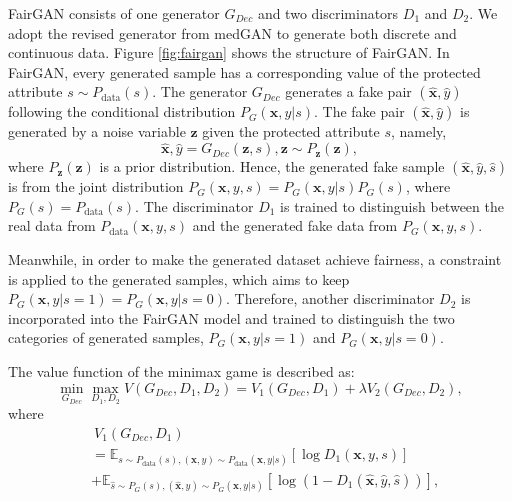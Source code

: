 \documentclass[sigconf]{acmart}
\theoremstyle{definition}
\begin{document}
FairGAN consists of one generator $G_{Dec}$ and two discriminators $D_1$ and $D_2$. We adopt the revised generator from medGAN \cite{Choi2017Generating} to generate both discrete and continuous data. Figure \ref{fig:fairgan} shows the structure of FairGAN. 
In FairGAN, every generated sample has a corresponding value of the protected attribute $s \sim P_{\text{data}}(s)$. The generator $G_{Dec}$ generates a fake pair $(\hat{\mathbf{x}},\hat{y})$ following the conditional distribution $P_{G}(\mathbf{x},y|s)$. The fake pair $(\hat{\mathbf{x}},\hat{y})$ is generated by a noise variable $\mathbf{z}$ given the protected attribute $s$, namely, 
\begin{equation}
\label{eq:generator}
\hat{\mathbf{x}},\hat{y} = G_{Dec}(\mathbf{z},s), \mathbf{z} \sim P_{\mathbf{z}}(\mathbf{z}), 
\end{equation}
where $P_{\mathbf{z}}(\mathbf{z})$ is a prior distribution. Hence, the generated fake sample $(\hat{\mathbf{x}},\hat{y},\hat{s})$ is from the joint distribution $P_{G}(\mathbf{x},y,s)=P_{G}(\mathbf{x},y|s)P_{G}(s)$, where $P_G(s)=P_{\text{data}}(s)$. 
The discriminator $D_1$ is trained to distinguish between the real data from $P_{\text{data}}(\mathbf{x}, y, s)$ and the generated fake data from $P_G(\mathbf{x},y,s)$.


Meanwhile, in order to make the generated dataset achieve fairness, a constraint is applied to the generated samples, which aims to keep $P_{G}(\mathbf{x},y|s=1) = P_{G}(\mathbf{x},y|s=0)$. Therefore, another discriminator $D_2$ is incorporated into the FairGAN model and trained to distinguish the two categories of generated samples, $P_{G}(\mathbf{x},y|s=1)$ and $P_{G}(\mathbf{x},y|s=0)$. 

The value function of the minimax game is described as:
\begin{equation}
\label{eq:fairgan}
		 \min_{G_{Dec}} \max_{D_1,D_2}  V(G_{Dec}, D_1, D_2) =  V_1(G_{Dec}, D_1) + \lambda V_2(G_{Dec}, D_2),  
\end{equation}
where 
\begin{equation}
\begin{split}
\label{eq:gan}
	& ~V_1  (G_{Dec},  D_1) \\ & = \mathbb{E}_{s \sim P_{\text{data}}(s), (\mathbf{x},y) \sim P_{\text{data}}(\mathbf{x},y|s)} {[\log D_1(\mathbf{x}, y, s)]} \\
		 & + \mathbb{E}_{\hat{s} \sim P_{G}(s), (\hat{\mathbf{x}},\hat{y}) \sim P_{G}(\mathbf{x},y|s)} {[\log (1 - D_1(\hat{\mathbf{x}},\hat{y}, \hat{s}))]},
\end{split}
\end{equation}
\end{document}
